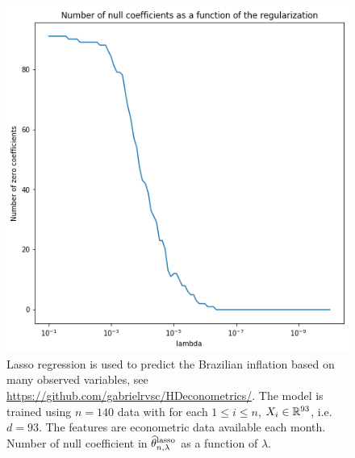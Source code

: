 \begin{figure}
\begin{center}
\includegraphics[width = .7\linewidth]{./Illustrations/lasso_nbzeros.png}
\end{center}
\caption{Lasso regression is used to predict the Brazilian inflation based on many observed variables, see \url{https://github.com/gabrielrvsc/HDeconometrics/}. The model is trained using $n=140$ data with for each $1\leqslant i \leqslant n$, $X_i\in\mathbb{R}^{93}$, i.e. $d  =93$. The features are econometric data available each month. Number of null coefficient in $\widehat {\theta}^{\mathrm{lasso}}_{n,\lambda}$ as a function of $\lambda$.}
\end{figure}

